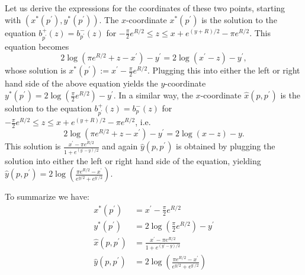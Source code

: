 Let us derive the expressions for the coordinates of these two points, starting with $(x^\ast(p^\prime), y^\ast(p^\prime))$. The $x$-coordinate $x^\ast(p^\prime)$ is the solution to the equation $b_{p^\prime}^+(z) = b_{p^\prime}^-(z)$ for $-\frac{\pi}{2} e^{R/2} \le z \le x + e^{(y + R)/2} - \pi e^{R/2}$. This equation becomes
\[
	2\log\left(\pi e^{R/2} + z - x^\prime\right) - y^\prime = 2 \log\left(x^\prime-z\right) - y^\prime,
\]
whose solution is $x^\ast(p^\prime) := x^\prime - \frac{\pi}{2} e^{R/2}$. Plugging this into either the left or right hand side of the above equation yields the $y$-coordinate $y^\ast(p^\prime) = 2\log\left(\frac{\pi}{2}e^{R/2}\right) - y^\prime$. In a similar way, the $x$-coordinate $\hat{x}(p,p^\prime)$ is the solution to the equation $b_{p^\prime}^+(z) = b_{p}^-(z)$ for $-\frac{\pi}{2} e^{R/2} \le z \le x + e^{(y + R)/2} - \pi e^{R/2}$, i.e.
\[
	2\log\left(\pi e^{R/2} + z - x^\prime\right) - y^\prime = 2 \log\left(x-z\right) - y.
\] 
This solution is $\frac{x^\prime - \pi e^{R/2}}{1 + e^{(y^\prime - y)/2}}$ and again $\hat{y}(p,p^\prime)$ is obtained by plugging the solution into either the left or right hand side of the equation, yielding $\hat{y}(p,p^\prime) = 2 \log\left(\frac{\pi e^{R/2} - x^\prime}{e^{y/2} + e^{y^\prime/2}}\right)$.

To summarize we have:
\begin{align*}
	x^\ast(p^\prime) &= x^\prime - \frac{\pi}{2} e^{R/2}\\
	y^\ast(p^\prime) &= 2\log\left(\frac{\pi}{2}e^{R/2}\right) - y^\prime\\
	\hat{x}(p,p^\prime) &= \frac{x^\prime - \pi e^{R/2}}{1 + e^{(y^\prime - y)/2}} \\
	\hat{y}(p,p^\prime) &= 2 \log\left(\frac{\pi e^{R/2} - x^\prime}{e^{y/2} + e^{y^\prime/2}}\right)
\end{align*}

